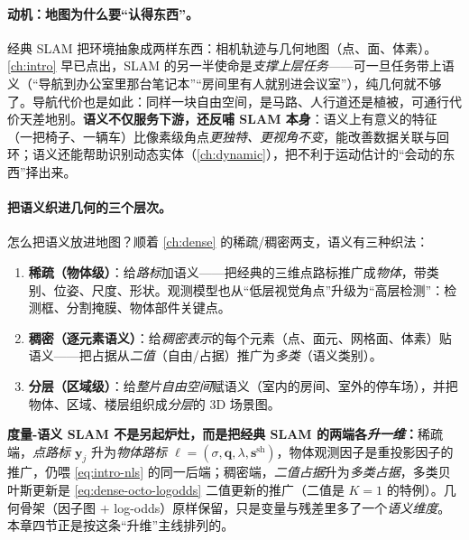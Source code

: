 \paragraph{动机：地图为什么要“认得东西”。}
经典 SLAM 把环境抽象成两样东西：相机轨迹与几何地图（点、面、体素）。\cref{ch:intro} 早已点出，SLAM 的另一半使命是\emph{支撑上层任务}——可一旦任务带上语义（“导航到办公室里那台笔记本”“房间里有人就别进会议室”），纯几何就不够了\cite{carlone2026handbook}。导航代价也是如此：同样一块自由空间，是马路、人行道还是植被，可通行代价天差地别\cite{maturana2018semantic}。\textbf{语义不仅服务下游，还反哺 SLAM 本身}：语义上有意义的特征（一把椅子、一辆车）比像素级角点\emph{更独特、更视角不变}，能改善数据关联与回环\cite{bowman2017probabilistic,civera2011towards}；语义还能帮助识别动态实体（\cref{ch:dynamic}），把不利于运动估计的“会动的东西”择出来\cite{rosinol2021kimera}。

\paragraph{把语义织进几何的三个层次。}
怎么把语义放进地图？顺着 \cref{ch:dense} 的稀疏/稠密两支，语义有三种织法\cite{carlone2026handbook}：
\begin{enumerate}
  \item \textbf{稀疏（物体级）}：给\emph{路标}加语义——把经典的三维点路标推广成\emph{物体}，带类别、位姿、尺度、形状。观测模型也从“低层视觉角点”升级为“高层检测”：检测框\cite{nicholson2019quadricslam}、分割掩膜\cite{he2017maskrcnn}、物体部件关键点\cite{pavlakos2017semantickeypoints}。
  \item \textbf{稠密（逐元素语义）}：给\emph{稠密表示}的每个元素（点、面元、网格面、体素）贴语义——把占据从\emph{二值}（自由/占据）推广为\emph{多类}（语义类别）。
  \item \textbf{分层（区域级）}：给\emph{整片自由空间}赋语义（室内的房间、室外的停车场），并把物体、区域、楼层组织成\emph{分层}的 3D 场景图。
\end{enumerate}

\begin{insight}
\textbf{度量-语义 SLAM 不是另起炉灶，而是把经典 SLAM 的两端各\emph{升一维}：}稀疏端，\emph{点路标 $\mathbf{y}_j$} 升为\emph{物体路标 $\boldsymbol\ell=(\sigma,\mathbf{q},\lambda,\mathbf{s}^{\mathrm{sh}})$}，物体观测因子是重投影因子的推广，仍喂 \cref{eq:intro-nls} 的同一后端；稠密端，\emph{二值占据}升为\emph{多类占据}，多类贝叶斯更新是 \cref{eq:dense-octo-logodds} 二值更新的推广（二值是 $K{=}1$ 的特例）。几何骨架（因子图 $+$ log-odds）原样保留，只是变量与残差里多了一个\emph{语义维度}。本章四节正是按这条“升维”主线排列的。
\end{insight}

